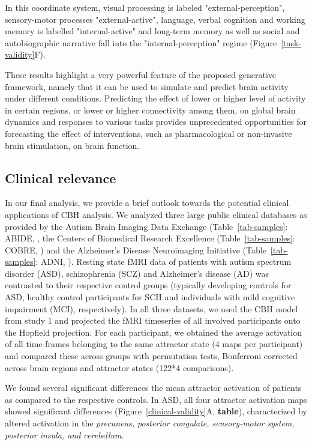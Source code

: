 \documentclass{article}
\begin{document}
In this coordinate system, visual processing is labeled "external-perception", sensory-motor processes
"external-active", language, verbal cognition and working memory is labelled "internal-active" and long-term memory
as well as social and autobiographic narrative fall into the "internal-perception" regime (Figure~\ref{task-validity}F).

These results highlight a very powerful feature of the proposed generative framework, namely that it can be used to
simulate and predict brain activity under different conditions. Predicting the effect of lower or higher level of
activity in certain regions, or lower or higher connectivity among them, on global brain dynamics and responses to
various tasks provides unprecedented opportunities for forecasting the effect of interventions, such as pharmacological
or non-invasive brain stimulation, on brain function.

\subsection{Clinical relevance}\label{Clinical relevance}

In our final analysis, we provide a brief outlook towards the potential clinical applications of CBH analysis. We
analyzed three large public clinical databases as provided by the Autism Brain Imaging Data Exchange
(Table~\ref{tab-samples}: ABIDE, \citep{di2014autism}, the Centers of Biomedical Research Excellence
(Table~\ref{tab-samples}: COBRE, \citep{aine2017multimodal}) and the Alzheimer's Disease Neuroimaging Initiative
(Table~\ref{tab-samples}: ADNI, \citep{petersen2010alzheimer}).
Resting state fMRI data of patients with autism spectrum disorder (ASD), schizophrenia (SCZ) and Alzheimer's disease
(AD) was contrasted to their respective control groups (typically developing controls for ASD, healthy control
participants for SCH and individuals with mild cognitive impairment (MCI), respectively). In all three datasets, we used
the CBH model from study 1 and projected the fMRI timeseries of all involved participants onto the Hopfield projection.
For each participant, we obtained the average activation of all time-frames belonging to the same attractor state
(4 maps per participant) and compared these across groups with permutation tests, Bonferroni corrected across brain
regions and attractor states (122*4 comparisons).

We found several significant differences the mean attractor activation of patients as compared to the respective
controls. In ASD, all four attractor activation maps showed significant differences (Figure~\ref{clinical-validity}A,
\textbf{table}), characterized by altered activation in the \textit{precuneus, posterior congulate, sensory-motor system,
posterior insula, and cerebellum}.
\end{document}
